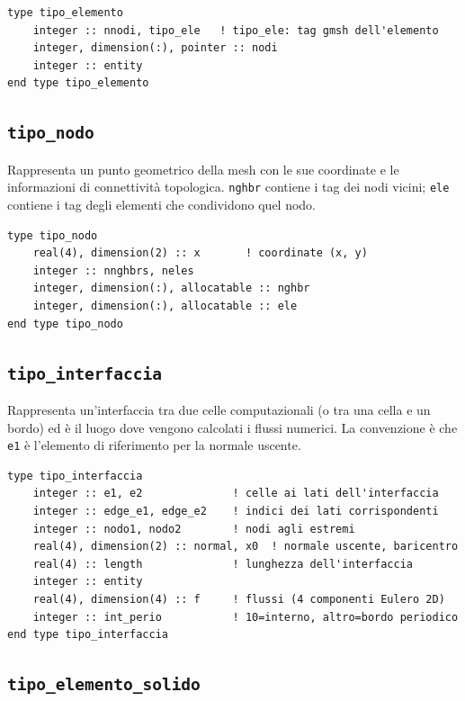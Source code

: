 \begin{lstlisting}[style=fortran]
type tipo_elemento
    integer :: nnodi, tipo_ele   ! tipo_ele: tag gmsh dell'elemento
    integer, dimension(:), pointer :: nodi
    integer :: entity
end type tipo_elemento
\end{lstlisting}

\subsection{\texttt{tipo\_nodo}}

Rappresenta un punto geometrico della mesh con le sue coordinate e
le informazioni di connettività topologica.
\texttt{nghbr} contiene i tag dei nodi vicini; \texttt{ele} contiene i tag
degli elementi che condividono quel nodo.

\begin{lstlisting}[style=fortran]
type tipo_nodo
    real(4), dimension(2) :: x       ! coordinate (x, y)
    integer :: nnghbrs, neles
    integer, dimension(:), allocatable :: nghbr
    integer, dimension(:), allocatable :: ele
end type tipo_nodo
\end{lstlisting}

\subsection{\texttt{tipo\_interfaccia}}

Rappresenta un'interfaccia tra due celle computazionali (o tra una cella
e un bordo) ed è il luogo dove vengono calcolati i flussi numerici.
La convenzione è che \texttt{e1} è l'elemento di riferimento per la
normale uscente.

\begin{lstlisting}[style=fortran]
type tipo_interfaccia
    integer :: e1, e2              ! celle ai lati dell'interfaccia
    integer :: edge_e1, edge_e2    ! indici dei lati corrispondenti
    integer :: nodo1, nodo2        ! nodi agli estremi
    real(4), dimension(2) :: normal, x0  ! normale uscente, baricentro
    real(4) :: length              ! lunghezza dell'interfaccia
    integer :: entity
    real(4), dimension(4) :: f     ! flussi (4 componenti Eulero 2D)
    integer :: int_perio           ! 10=interno, altro=bordo periodico
end type tipo_interfaccia
\end{lstlisting}

\subsection{\texttt{tipo\_elemento\_solido}}

